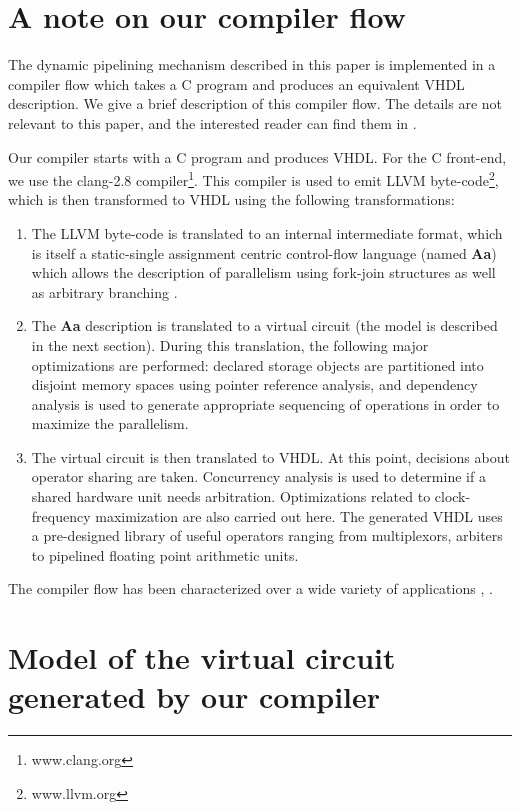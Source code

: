 \documentclass[conference]{IEEEtran}
\begin{document}

\section{A note on our compiler flow}

The dynamic pipelining mechanism described in this paper
is implemented in a compiler flow which takes 
a C program and produces an equivalent VHDL description.
We give a brief description of this compiler flow.  The
details are not relevant to this paper, and the interested
reader can find them in \cite{ahirDsd2010}.

Our compiler starts with a C program and produces VHDL.  For the
C front-end, we use the clang-2.8 compiler\footnote{www.clang.org}.
This compiler is used to emit LLVM byte-code\footnote{www.llvm.org}, 
which is then transformed to VHDL using the following transformations:
\begin{enumerate}
\item The LLVM byte-code is translated to an internal intermediate
format, which is itself a static-single assignment centric 
control-flow language (named {\bf Aa}) which allows the description of parallelism
using fork-join structures as well as arbitrary branching \cite{Aa}.
\item The {\bf Aa} description is translated to a virtual circuit (the model
is described in the next section).  During this translation, the
following major optimizations
are performed:  declared storage objects are partitioned into disjoint memory
spaces using pointer reference analysis, and dependency analysis is used to
generate appropriate sequencing of operations in order to maximize the 
parallelism.
\item The virtual circuit is then translated to VHDL.  At this point,
decisions about operator sharing are taken.  Concurrency analysis is
used to determine if a shared hardware unit needs arbitration.  Optimizations
related to clock-frequency maximization are also carried out here.
The generated
VHDL uses a pre-designed library of useful operators ranging from
multiplexors, arbiters to pipelined floating point arithmetic units.
\end{enumerate}

The compiler flow has been characterized over a wide variety
of applications \cite{ahirDsd2010}, \cite{ahirUsenix2012}.



\section{Model of the virtual circuit generated by our compiler}
\end{document}
